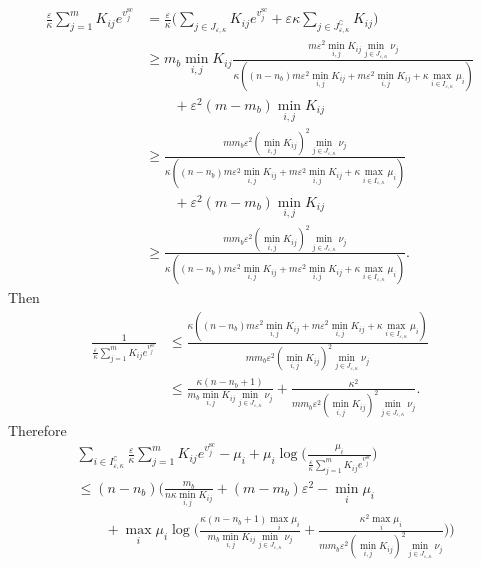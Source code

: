 \documentclass{article}
\begin{document}
\begin{align*}
\frac \varepsilon\kappa\sum_{j=1}^m K_{ij} e^{v^{\text{sc}}_j}&=\frac \varepsilon\kappa \Big(\sum_{j\in J_{\varepsilon,\kappa}}K_{ij} e^{v^{\text{sc}}_j} + \varepsilon \kappa\sum_{j\in J^\complement_{\varepsilon,\kappa}}K_{ij}\Big)\\
&\geq m_b\min_{i,j}K_{ij} \frac{m\varepsilon^2\min_{i,j}K_{ij}\min_{j \in J_{\varepsilon,\kappa}}\nu_j}{\kappa((n-n_b)m\varepsilon^2\min_{i,j}K_{ij} + m\varepsilon^2\min_{i,j}K_{ij} + \kappa\max_{i\in I_{\varepsilon,\kappa}}\mu_i)}\\
&\qquad +\varepsilon^2 (m- m_b) \min_{i,j}K_{ij}\\
&\geq \frac{mm_b\varepsilon^2(\min_{i,j}K_{ij})^2\min_{j \in J_{\varepsilon,\kappa}}\nu_j}{\kappa((n-n_b)m\varepsilon^2\min_{i,j}K_{ij}+ m\varepsilon^2\min_{i,j}K_{ij} + \kappa\max_{i\in I_{\varepsilon,\kappa}}\mu_i)}\\
&\qquad +\varepsilon^2 (m- m_b) \min_{i,j}K_{ij}\\
&\geq \frac{mm_b\varepsilon^2(\min_{i,j}K_{ij})^2\min_{j \in J_{\varepsilon,\kappa}}\nu_j}{\kappa((n-n_b)m\varepsilon^2\min_{i,j}K_{ij}+ m\varepsilon^2\min_{i,j}K_{ij} + \kappa\max_{i\in I_{\varepsilon,\kappa}}\mu_i)}.
\end{align*}
Then 
\begin{align*}
\frac{1}{\frac \varepsilon\kappa\sum_{j=1}^m K_{ij} e^{v^{\text{sc}}_j}} &\leq \frac{\kappa((n-n_b)m\varepsilon^2\min_{i,j}K_{ij}+ m\varepsilon^2\min_{i,j}K_{ij} + \kappa\max_{i\in I_{\varepsilon,\kappa}}\mu_i)}{mm_b\varepsilon^2(\min_{i,j}K_{ij})^2\min_{j \in J_{\varepsilon,\kappa}}\nu_j}\\
&\leq \frac{\kappa(n-n_b+ 1)}{m_b\min_{i,j}K_{ij}\min_{j \in J_{\varepsilon,\kappa}}\nu_j} + \frac{\kappa^2}{mm_b\varepsilon^2(\min_{i,j}K_{ij})^2\min_{j \in J_{\varepsilon,\kappa}}\nu_j}.
\end{align*}
Therefore
\begin{align*}
&\sum_{i\in I^\complement_{\varepsilon,\kappa}}\frac \varepsilon\kappa\sum_{j=1}^m K_{ij} e^{v^{\text{sc}}_j} - \mu_i + \mu_i \log\Big(\frac{\mu_i}{\frac \varepsilon\kappa\sum_{j=1}^m K_{ij} e^{v^{\text{sc}}_j}}\Big)\\
&\leq (n-n_b)\bigg(\frac{m_b}{n\kappa\min_{i,j} K_{ij}} + (m- m_b) \varepsilon^2 - \min_{i}\mu_i\\
&\qquad + \max_{i}\mu_i\log\Big(\frac{\kappa(n-n_b+ 1)\max_{i}\mu_i}{m_b\min_{i,j}K_{ij}\min_{j \in J_{\varepsilon,\kappa}}\nu_j} + \frac{\kappa^2\max_{i}\mu_i}{mm_b\varepsilon^2(\min_{i,j}K_{ij})^2\min_{j \in J_{\varepsilon,\kappa}}\nu_j}\Big)
\bigg)
\end{align*}
\end{document}
